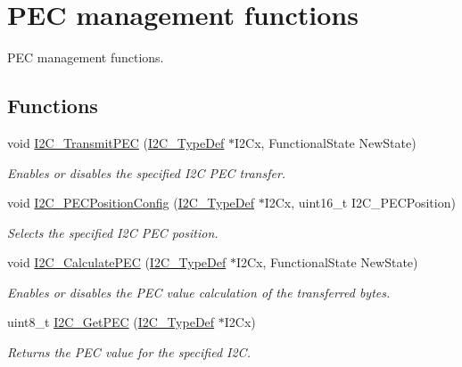 \hypertarget{group___i2_c___group3}{}\section{P\+E\+C management functions}
\label{group___i2_c___group3}


P\+E\+C management functions.  


\subsection*{Functions}
\begin{DoxyCompactItemize}
\item 
void \hyperlink{group___i2_c___group3_gaa27d1440290fe601e730b6980999afe3}{I2\+C\+\_\+\+Transmit\+P\+E\+C} (\hyperlink{struct_i2_c___type_def}{I2\+C\+\_\+\+Type\+Def} $\ast$I2\+Cx, Functional\+State New\+State)
\begin{DoxyCompactList}\small\item\em Enables or disables the specified I2\+C P\+E\+C transfer. \end{DoxyCompactList}\item 
void \hyperlink{group___i2_c___group3_ga5d0f939bdd45542502827bf408f24161}{I2\+C\+\_\+\+P\+E\+C\+Position\+Config} (\hyperlink{struct_i2_c___type_def}{I2\+C\+\_\+\+Type\+Def} $\ast$I2\+Cx, uint16\+\_\+t I2\+C\+\_\+\+P\+E\+C\+Position)
\begin{DoxyCompactList}\small\item\em Selects the specified I2\+C P\+E\+C position. \end{DoxyCompactList}\item 
void \hyperlink{group___i2_c___group3_gae86801251359226c35745e0a258388b0}{I2\+C\+\_\+\+Calculate\+P\+E\+C} (\hyperlink{struct_i2_c___type_def}{I2\+C\+\_\+\+Type\+Def} $\ast$I2\+Cx, Functional\+State New\+State)
\begin{DoxyCompactList}\small\item\em Enables or disables the P\+E\+C value calculation of the transferred bytes. \end{DoxyCompactList}\item 
uint8\+\_\+t \hyperlink{group___i2_c___group3_ga7bf75e7c27c0e1d73e70fc0e1c7cd1dd}{I2\+C\+\_\+\+Get\+P\+E\+C} (\hyperlink{struct_i2_c___type_def}{I2\+C\+\_\+\+Type\+Def} $\ast$I2\+Cx)
\begin{DoxyCompactList}\small\item\em Returns the P\+E\+C value for the specified I2\+C. \end{DoxyCompactList}\end{DoxyCompactItemize}


